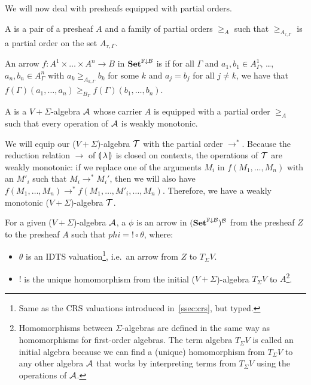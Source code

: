 We will now deal with presheafs equipped with partial orders.

\begin{definition}
  A  is a pair of a presheaf
  $A$ and a family of partial orders $\ge_A$ such that
  $\ge_{A_{\tau,\Gamma}}$ is a partial order on the set $A_{\tau,\Gamma}$.
\end{definition}

\begin{definition}
  An arrow $f : A^1 \times \ldots \times A^n \to B$ in $\mathbf{Set}^{\mathbb{F}\downarrow\mathcal{B}}$ is
   if for all $\Gamma$ and
  $a_1, b_1 \in A^1_\Gamma$, \ldots, $a_n, b_n \in A^n_\Gamma$ with
  $a_k \ge_{A_{k,\Gamma}} b_k$ for some $k$ and $a_j = b_j$ for all
  $j \neq k$, we have that
  $f(\Gamma)(a_1, \ldots, a_n) \ge_{B_\Gamma} f(\Gamma)(b_1, \ldots,
  b_n)$.
\end{definition}

\begin{definition}
  A  is a $V+\Sigma$-algebra
  $\mathcal{A}$ whose carrier $A$ is equipped with a partial order $\ge_A$ such
  that every operation of $\mathcal{A}$ is weakly monotonic.
\end{definition}

We will equip our ($V+\Sigma$)-algebra $\mathcal{T}$ with the partial order
$\to^*$. Because the reduction relation $\to$ of $\llparenthesis \, \lambda \, \rrparenthesis$ is
closed on contexts, the operations of $\mathcal{T}$ are weakly monotonic: if we
replace one of the arguments $M_i$ in $f(M_1,\ldots,M_n)$ with an $M'_i$
such that $M_i \to^* M_i'$, then we will also have
$f(M_1,\ldots,M_n) \to^* f(M_1,\ldots,M'_i,\ldots,M_n)$. Therefore, we have
a weakly monotonic ($V+\Sigma$)-algebra $\mathcal{T}$.

\begin{definition}
  For a given ($V+\Sigma$)-algebra $\mathcal{A}$, a  $\phi$ is an arrow in $(\mathbf{Set}^{\mathbb{F}\downarrow\mathcal{B}})^{\mathcal{B}}$ from the
  presheaf $Z$ to the presheaf $A$ such that $phi = ! \circ \theta$, where:

  \begin{itemize}
  \item $\theta$ is an IDTS valuation\footnote{Same as the CRS valuations
      introduced in~\ref{ssec:crs}, but typed.}, i.e.\ an arrow from $Z$ to
    $T_\Sigma V$.
  \item $!$ is the unique homomorphism from the initial
    ($V+\Sigma$)-algebra $T_\Sigma V$ to $A$\footnote{Homomorphisms between
      $\Sigma$-algebras are defined in the same way as homomorphisms for
      first-order algebras. The term algebra $T_\Sigma V$ is called an
      initial algebra because we can find a (unique) homomorphism from
      $T_\Sigma V$ to any other algebra $\mathcal{A}$ that works by interpreting
      terms from $T_\Sigma V$ using the operations of $\mathcal{A}$.}.
  \end{itemize}
\end{definition}

